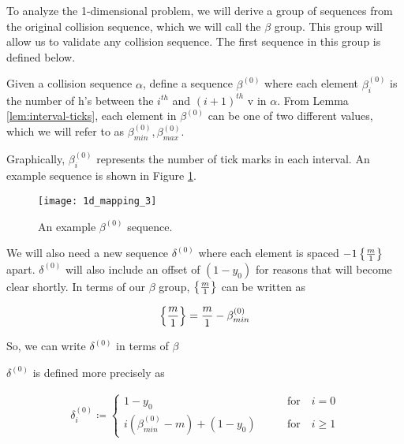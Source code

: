 
To analyze the 1-dimensional problem, we will derive a group of sequences from the original collision sequence, which we will call the $\beta$ group. This group will allow us to validate any collision sequence. The first sequence in this group is defined below.

\begin{definition}
	Given a collision sequence $\alpha$, define a sequence $\beta^{(0)}$ where each element $\beta^{(0)}_i$ is the number of h's between the $i^{th}$ and $(i+1)^{th}$ v in $\alpha$. From Lemma \ref{lem:interval-ticks}, each element in $\beta^{(0)}$ can be one of two different values, which we will refer to as $\beta^{(0)}_{min}, \beta^{(0)}_{max}$.
\end{definition}

Graphically, $\beta^{(0)}_i$ represents the number of tick marks in each interval. An example sequence is shown in Figure \ref{fig:beta-sequence}.

\begin{figure}[H]
  \begin{center}
    \texttt{[image: 1d\_mapping\_3]}
  \end{center}
  \vspace{-.2in} %
  \caption{\label{fig:beta-sequence} An example $\beta^{(0)}$ sequence.}
\end{figure}

 We will also need a new sequence $\delta^{(0)}$ where each element is spaced $-1 \, \cbracket{\frac{m}{1}}$ apart. $\delta^{(0)}$ will also include an offset of $(1-y_0)$ for reasons that will become clear shortly. In terms of our $\beta$ group, $\cbracket{\frac{m}{1}}$ can be written as 

\begin{equation}
  \cbracket{\frac{m}{1}} = \frac{m}{1} - \beta^{(0)}_{min}
\end{equation}

So, we can write $\delta^{(0)}$ in terms of $\beta$

\begin{definition}
  $\delta^{(0)}$ is defined more precisely as

  \begin{align}\label{delta_beta}
    \delta^{(0)}_i \coloneqq \begin{cases}
      1-y_0 \qquad &\text{for} \quad i = 0\\
      i (\beta^{(0)}_{min} - m) + (1-y_0) \qquad &\text{for} \quad i \ge 1
    \end{cases}
  \end{align}
\end{definition}

